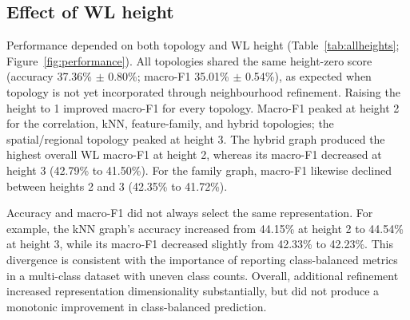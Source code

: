 \documentclass[conference]{IEEEtran}
\begin{document}
\subsection{Effect of WL height}

Performance depended on both topology and WL height (Table~\ref{tab:allheights}; Figure~\ref{fig:performance}). All topologies shared the same height-zero score (accuracy 37.36\% $\pm$ 0.80\%; macro-F1 35.01\% $\pm$ 0.54\%), as expected when topology is not yet incorporated through neighbourhood refinement. Raising the height to 1 improved macro-F1 for every topology. Macro-F1 peaked at height 2 for the correlation, kNN, feature-family, and hybrid topologies; the spatial/regional topology peaked at height 3. The hybrid graph produced the highest overall WL macro-F1 at height 2, whereas its macro-F1 decreased at height 3 (42.79\% to 41.50\%). For the family graph, macro-F1 likewise declined between heights 2 and 3 (42.35\% to 41.72\%).

Accuracy and macro-F1 did not always select the same representation. For example, the kNN graph's accuracy increased from 44.15\% at height 2 to 44.54\% at height 3, while its macro-F1 decreased slightly from 42.33\% to 42.23\%. This divergence is consistent with the importance of reporting class-balanced metrics in a multi-class dataset with uneven class counts. Overall, additional refinement increased representation dimensionality substantially, but did not produce a monotonic improvement in class-balanced prediction.
\end{document}
